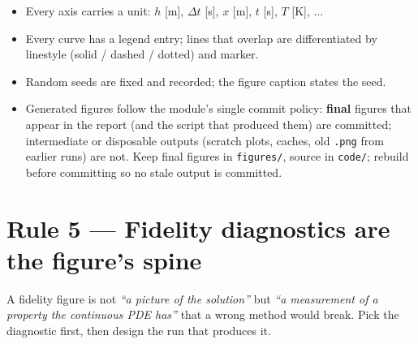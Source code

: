 \documentclass[11pt]{article}
\begin{document}
\begin{itemize}[leftmargin=2em, itemsep=1pt]
  \item Every axis carries a unit: $h$ [m], $\Delta t$ [s], $x$ [m], $t$ [s], $T$ [K], ...
  \item Every curve has a legend entry; lines that overlap are differentiated
        by linestyle (solid / dashed / dotted) and marker.
  \item Random seeds are fixed and recorded; the figure caption
        states the seed.
  \item Generated figures follow the module's single commit policy:
        \textbf{final} figures that appear in the report (and the script
        that produced them) are committed; intermediate or disposable
        outputs (scratch plots, caches, old \texttt{.png} from earlier
        runs) are not. Keep final figures in \texttt{figures/}, source in
        \texttt{code/}; rebuild before committing so no stale output is
        committed.
\end{itemize}

\section*{Rule 5 --- Fidelity diagnostics are the figure's spine}

A fidelity figure is not \emph{``a picture of the solution''} but
\emph{``a measurement of a property the continuous PDE has''} that a
wrong method would break. Pick the diagnostic first, then design the run
that produces it.
\end{document}
